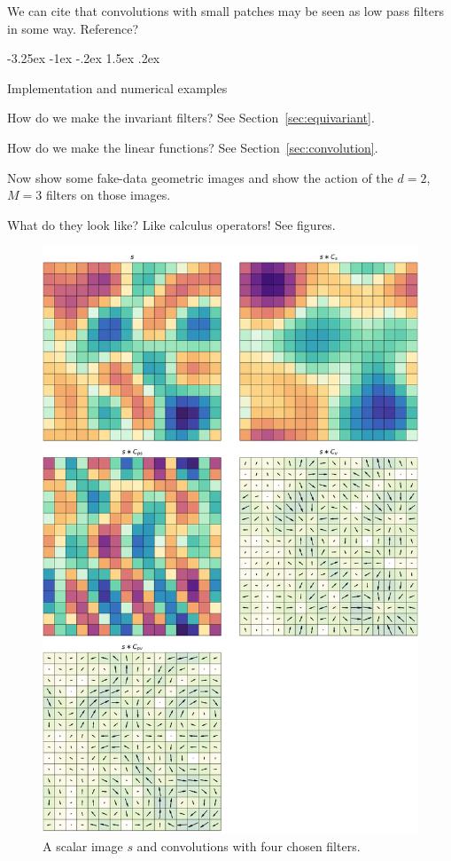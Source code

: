 \documentclass{article}
\makeatletter
\theoremstyle{plain}
\newcommand{\sectionname}{Section}
\newcommand{\secref}[1]{\sectionname~\ref{#1}}
\renewcommand\section{\@startsection {section}{1}{\z@}%
  {-3.25ex \@plus -1ex \@minus -.2ex}%
  {1.5ex \@plus .2ex}%
  {\raggedright\normalfont\large\bfseries}}%
\makeatother
\begin{document}
We can cite that convolutions with small patches may be seen as low pass filters in some way. Reference?

\section{Implementation and numerical examples}\label{sec:examples}

How do we make the invariant filters? See \secref{sec:equivariant}.

How do we make the linear functions? See \secref{sec:convolution}.

Now show some fake-data geometric images and show the action of the $d=2$, $M=3$ filters on those images.

What do they look like? Like calculus operators! See figures.
\begin{figure}
  \begin{mdframed}
  \color{captiongray}
  \begin{center}
    \includegraphics[width=\textwidth]{notebooks/monomials_1.png}
  \end{center}
    \caption{A scalar image $s$ and convolutions with four chosen filters.}
  \end{mdframed}
\end{figure}
\end{document}

